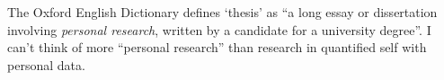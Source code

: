 \documentclass[a4paper]{article}
\begin{document}
\begin{refsection}
    The Oxford English Dictionary defines `thesis' as ``a long essay or dissertation involving \emph{personal research}, written by a candidate for a university degree''. I can't think of more ``personal research'' than research in quantified self with personal data.


\printbibliography[category=cited]

\nocite{*}
  {\list{}
     {\setlength{\leftmargin}{\bibhang}%
      \setlength{\itemindent}{-\leftmargin}%
      \setlength{\itemsep}{\bibitemsep}%
      \setlength{\parsep}{\bibparsep}}
  }
  {\endlist}
  {\item}
\printbibliography[notcategory=cited, env=bibnonum, heading=notcited]

\end{refsection}
\end{document}
